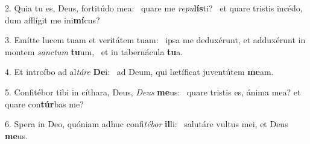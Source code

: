 2. Quia tu es, Deus, fortitúdo mea: \dag\  quare me \textit{re}\textit{pu}\textbf{lís}ti? \ast\  et quare tristis incédo, dum afflígit me ini\textbf{mí}cus?\

3. Emítte lucem tuam et veritátem tuam: \dag\  ipsa me deduxérunt, et adduxérunt in montem \textit{sanc}\textit{tum} \textbf{tu}um, \ast\  et in tabernácula \textbf{tu}a.\

4. Et introíbo ad al\textit{tá}\textit{re} \textbf{De}i: \ast\  ad Deum, qui lætíficat juventútem \textbf{me}am.\

5. Confitébor tibi in cíthara, Deus, \textit{De}\textit{us} \textbf{me}us: \ast\  quare tristis es, ánima mea? et quare con\textbf{túr}bas me?\

6. Spera in Deo, quóniam adhuc confi\textit{té}\textit{bor} \textbf{il}li: \ast\  salutáre vultus mei, et Deus \textbf{me}us.\

